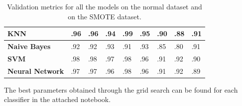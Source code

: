 \begin{table}[h]
\begin{tabular}{l|llll|llll|}
\multicolumn{1}{|l|}{\textbf{KNN}}            & \multicolumn{1}{l|}{.96}        & \multicolumn{1}{l|}{.96}         & \multicolumn{1}{l|}{.94}        & .99                             & \multicolumn{1}{l|}{.95}        & \multicolumn{1}{l|}{.90}         & \multicolumn{1}{l|}{.88}        & .91                             \\ \hline
\multicolumn{1}{|l|}{\textbf{Naive Bayes}}    & \multicolumn{1}{l|}{.92}        & \multicolumn{1}{l|}{.92}         & \multicolumn{1}{l|}{.93}        & .91                             & \multicolumn{1}{l|}{.93}        & \multicolumn{1}{l|}{.85}         & \multicolumn{1}{l|}{.80}        & .91                             \\ \hline
\multicolumn{1}{|l|}{\textbf{SVM}}            & \multicolumn{1}{l|}{.98}        & \multicolumn{1}{l|}{.98}         & \multicolumn{1}{l|}{.97}        & .98                             & \multicolumn{1}{l|}{.96}        & \multicolumn{1}{l|}{.91}         & \multicolumn{1}{l|}{.92}        & .90                             \\ \hline
\multicolumn{1}{|l|}{\textbf{Neural Network}} & \multicolumn{1}{l|}{.97}        & \multicolumn{1}{l|}{.97}         & \multicolumn{1}{l|}{.96}        & .98                             & \multicolumn{1}{l|}{.96}        & \multicolumn{1}{l|}{.91}         & \multicolumn{1}{l|}{.92}        & .89                             \\ \hline
\end{tabular}
\caption{Validation metrics for all the models on the normal dataset and on the SMOTE dataset.}
\label{tab:metrics-validation}
\end{table}

The best parameters obtained through the grid search can be found for each classifier in the attached notebook.

